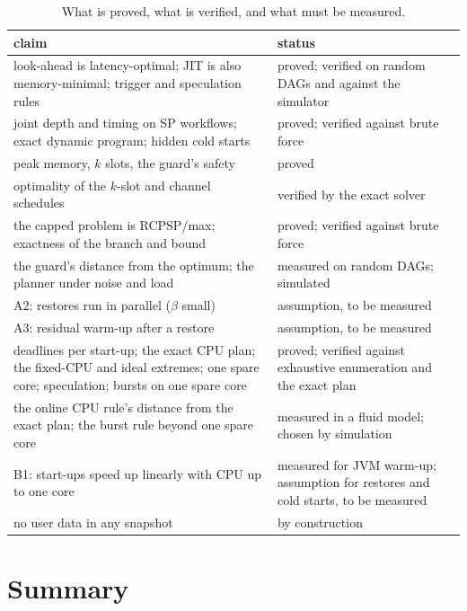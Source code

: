 \begin{table}[t]
\centering
\caption{What is proved, what is verified, and what must be measured.}
\label{tab:status}
\small
\begin{tabular}{@{}p{}p{}@{}}
\toprule
claim & status \\
\midrule
look-ahead is latency-optimal; JIT is also memory-minimal; trigger and speculation rules &
  proved; verified on random DAGs and against the simulator \\
joint depth and timing on SP workflows; exact dynamic program; hidden cold starts &
  proved; verified against brute force \\
peak memory, $k$ slots, the guard's safety & proved \\
optimality of the $k$-slot and channel schedules & verified by the exact solver \\
the capped problem is RCPSP/max; exactness of the branch and bound & proved; verified against
  brute force \\
the guard's distance from the optimum; the planner under noise and load & measured on random
  DAGs; simulated \\
A2: restores run in parallel ($\beta$ small) & assumption, to be measured \\
A3: residual warm-up after a restore & assumption, to be measured \\
deadlines per start-up; the exact CPU plan; the fixed-CPU and ideal extremes; one spare core;
  speculation; bursts on one spare core & proved; verified against exhaustive enumeration and the
  exact plan \\
the online CPU rule's distance from the exact plan; the burst rule beyond one spare core &
  measured in a fluid model; chosen by simulation \\
B1: start-ups speed up linearly with CPU up to one core & measured for JVM warm-up; assumption
  for restores and cold starts, to be measured \\
no user data in any snapshot & by construction \\
\bottomrule
\end{tabular}
\end{table}

\section{Summary}
\label{sec:th-summary}

